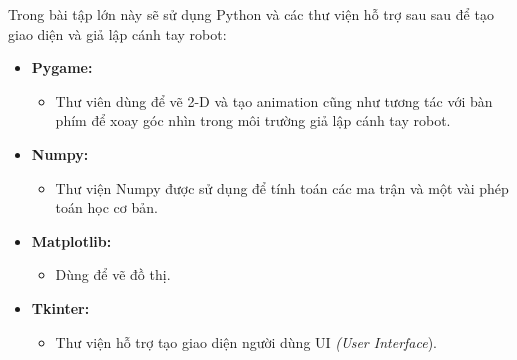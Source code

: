 Trong bài tập lớn này sẽ sử dụng Python và các thư viện hỗ trợ sau sau để tạo giao diện và giả lập cánh tay robot:
\begin{itemize}
    \item \textbf{Pygame:}
    \begin{itemize}
        \item Thư viên dùng để vẽ 2-D và tạo animation cũng như tương tác với bàn phím để xoay góc nhìn trong môi trường giả lập cánh tay robot.
    \end{itemize}
    \item \textbf{Numpy:}
    \begin{itemize}
        \item Thư viện Numpy được sử dụng để tính toán các ma trận và một vài phép toán học cơ bản.
    \end{itemize}
    \item \textbf{Matplotlib:}
    \begin{itemize}
        \item Dùng để vẽ đồ thị.
    \end{itemize}
    \item \textbf{Tkinter:}
    \begin{itemize}
        \item Thư viện hỗ trợ tạo giao diện người dùng UI \textit{(User Interface}).
    \end{itemize}
\end{itemize}

